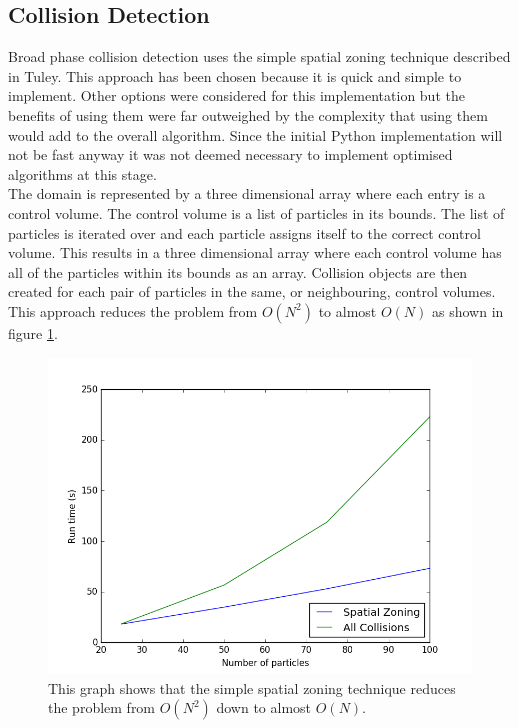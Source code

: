 \documentclass[10pt,a4paper,titlepage]{report}
\begin{document}
\subsection{Collision Detection}
Broad phase collision detection uses the simple spatial zoning technique described in Tuley\cite{tuley}. This approach has been chosen because it is quick and simple to implement. Other options were considered for this implementation but the benefits of using them were far outweighed by the complexity that using them would add to the overall algorithm. Since the initial Python implementation will not be fast anyway it was not deemed necessary to implement optimised algorithms at this stage.
\\The domain is represented by a three dimensional array where each entry is a control volume. The control volume is a list of particles in its bounds. The list of particles is iterated over and each particle assigns itself to the correct control volume. This results in a three dimensional array where each control volume has all of the particles within its bounds as an array. Collision objects are then created for each pair of particles in the same, or neighbouring, control volumes. This approach reduces the problem from $O(N^{2})$ to almost $O(N)$ as shown in figure \ref{fig:run_time_against_N_python}.
\begin{figure}[!ht]
\centering
\includegraphics[scale=0.75]{figures/RunTimeAgainstNumberOfParticlesPython.png}
\caption{This graph shows that the simple spatial zoning technique reduces the problem from $O(N^{2})$ down to almost $O(N)$.}
\label{fig:run_time_against_N_python}
\end{figure}
\end{document}

